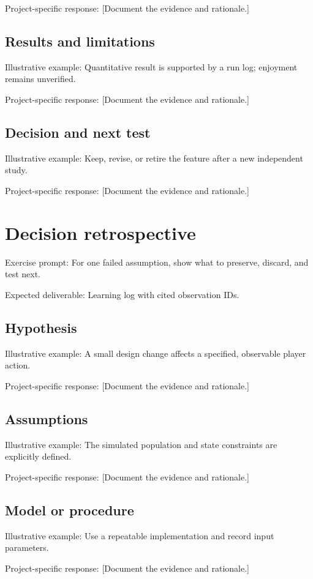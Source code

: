 \documentclass[11pt]{article}
\begin{document}
Project-specific response: [Document the evidence and rationale.]


\subsection{Results and limitations}
Illustrative example: Quantitative result is supported by a run log; enjoyment remains unverified.

Project-specific response: [Document the evidence and rationale.]


\subsection{Decision and next test}
Illustrative example: Keep, revise, or retire the feature after a new independent study.

Project-specific response: [Document the evidence and rationale.]


\section{Decision retrospective}
Exercise prompt: For one failed assumption, show what to preserve, discard, and test next.

Expected deliverable: Learning log with cited observation IDs.


\subsection{Hypothesis}
Illustrative example: A small design change affects a specified, observable player action.

Project-specific response: [Document the evidence and rationale.]


\subsection{Assumptions}
Illustrative example: The simulated population and state constraints are explicitly defined.

Project-specific response: [Document the evidence and rationale.]


\subsection{Model or procedure}
Illustrative example: Use a repeatable implementation and record input parameters.

Project-specific response: [Document the evidence and rationale.]
\end{document}
